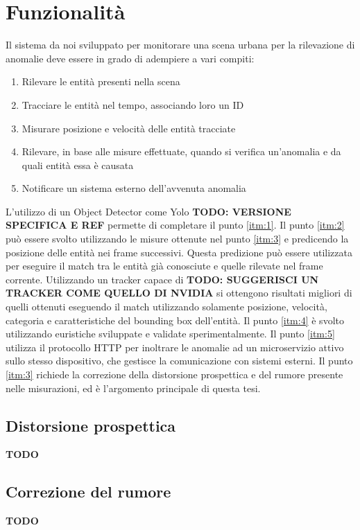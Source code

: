 \chapter{Funzionalità}
\label{sec:funzionalita}

Il sistema da noi sviluppato per monitorare una scena urbana per la rilevazione di anomalie deve essere in grado di adempiere a vari compiti:
\begin{enumerate}
    \item \label{itm:1} Rilevare le entità presenti nella scena
    \item \label{itm:2} Tracciare le entità nel tempo, associando loro un ID
    \item \label{itm:3} Misurare posizione e velocità delle entità tracciate
    \item \label{itm:4} Rilevare, in base alle misure effettuate, quando si verifica un'anomalia e da quali entità essa è causata
    \item \label{itm:5} Notificare un sistema esterno dell'avvenuta anomalia
\end{enumerate}

L'utilizzo di un Object Detector come Yolo \textbf{TODO: VERSIONE SPECIFICA E REF} permette di completare il punto \ref{itm:1}.
Il punto \ref{itm:2} può essere svolto utilizzando le misure ottenute nel punto \ref{itm:3} e predicendo la posizione delle entità nei frame successivi. 
Questa predizione può essere utilizzata per eseguire il match tra le entità già conosciute e quelle rilevate nel frame corrente. 
Utilizzando un tracker capace di \textbf{TODO: SUGGERISCI UN TRACKER COME QUELLO DI NVIDIA} si ottengono risultati migliori di quelli ottenuti eseguendo il match utilizzando solamente posizione, velocità, categoria e caratteristiche del bounding box dell'entità.
Il punto \ref{itm:4} è svolto utilizzando euristiche sviluppate e validate sperimentalmente. 
Il punto \ref{itm:5} utilizza il protocollo HTTP per inoltrare le anomalie ad un microservizio attivo sullo stesso dispositivo, che gestisce la comunicazione con sistemi esterni.
Il punto \ref{itm:3} richiede la correzione della distorsione prospettica e del rumore presente nelle misurazioni, ed è l'argomento principale di questa tesi.

\section{Distorsione prospettica}
\textbf{TODO}

\section{Correzione del rumore}
\textbf{TODO}
